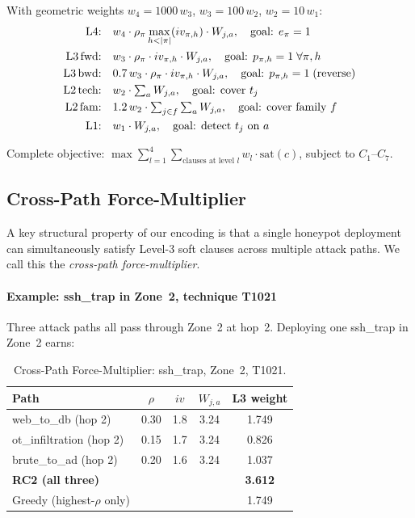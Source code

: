 \documentclass[journal]{IEEEtran}
\begin{document}
With geometric weights $w_4=1000\,w_3$, $w_3=100\,w_2$,
$w_2=10\,w_1$:
\begin{align}
  \text{L4:}& \quad w_4\cdot\rho_\pi
    \max_{h<|\pi|}(iv_{\pi,h})\cdot W_{j,a},
    \quad\text{goal: }e_\pi=1 \label{eq:L4}\\
  \text{L3\,fwd:}& \quad w_3\cdot\rho_\pi\cdot iv_{\pi,h}
    \cdot W_{j,a},
    \quad\text{goal: }p_{\pi,h}=1\;\forall\pi,h \label{eq:L3f}\\
  \text{L3\,bwd:}& \quad 0.7\,w_3\cdot\rho_\pi\cdot iv_{\pi,h}
    \cdot W_{j,a},
    \quad\text{goal: }p_{\pi,h}=1\;\text{(reverse)} \label{eq:L3b}\\
  \text{L2\,tech:}& \quad w_2\cdot\textstyle\sum_a W_{j,a},
    \quad\text{goal: cover }t_j \label{eq:L2t}\\
  \text{L2\,fam:}& \quad 1.2\,w_2\cdot
    \textstyle\sum_{j\in f}\sum_a W_{j,a},
    \quad\text{goal: cover family }f \label{eq:L2f}\\
  \text{L1:}& \quad w_1\cdot W_{j,a},
    \quad\text{goal: detect }t_j\text{ on }a \label{eq:L1}
\end{align}

Complete objective:
$\max\sum_{l=1}^{4}\sum_{\text{clauses at level }l}
w_l\cdot\mathrm{sat}(c)$, subject to $C_1$--$C_7$.

\subsection{Cross-Path Force-Multiplier}
\label{sec:forcemult}

A key structural property of our encoding is that a single honeypot
deployment can simultaneously satisfy Level-3 soft clauses across
multiple attack paths. We call this the \emph{cross-path
force-multiplier}.

\paragraph{Example: ssh\_trap in Zone~2, technique T1021}
Three attack paths all pass through Zone~2 at hop~2. Deploying one
ssh\_trap in Zone~2 earns:

\begin{table}[t]
\caption{Cross-Path Force-Multiplier: ssh\_trap, Zone~2, T1021.}
\label{tab:forcemult}
\centering
\renewcommand{\arraystretch}{1.2}
\begin{tabular}{lcccc}
\toprule
Path & $\rho$ & $iv$ & $W_{j,a}$ & L3 weight \\
\midrule
web\_to\_db (hop 2) & 0.30 & 1.8 & 3.24 & 1.749 \\
ot\_infiltration (hop 2) & 0.15 & 1.7 & 3.24 & 0.826 \\
brute\_to\_ad (hop 2) & 0.20 & 1.6 & 3.24 & 1.037 \\
\midrule
\textbf{RC2 (all three)} & & & & \textbf{3.612} \\
Greedy (highest-$\rho$ only) & & & & 1.749 \\
\bottomrule
\end{tabular}
\end{table}
\end{document}
